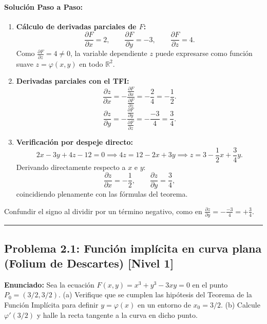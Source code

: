 \documentclass[11pt,a4paper]{article}
\begin{document}
\paragraph{Solución Paso a Paso:}\par
\begin{enumerate}[label=\textbf{\arabic*.}]
\item \textbf{Cálculo de derivadas parciales de $F$:}
\[ \frac{\partial F}{\partial x} = 2, \qquad \frac{\partial F}{\partial y} = -3, \qquad \frac{\partial F}{\partial z} = 4. \]
Como $\frac{\partial F}{\partial z} = 4 \neq 0$, la variable dependiente $z$ puede expresarse como función suave $z = \varphi(x,y)$ en todo $\mathbb{R}^2$.
\item \textbf{Derivadas parciales con el TFI:}
\[ \frac{\partial z}{\partial x} = -\frac{\frac{\partial F}{\partial x}}{\frac{\partial F}{\partial z}} = -\frac{2}{4} = -\frac{1}{2}. \]
\[ \frac{\partial z}{\partial y} = -\frac{\frac{\partial F}{\partial y}}{\frac{\partial F}{\partial z}} = -\frac{-3}{4} = \frac{3}{4}. \]
\item \textbf{Verificación por despeje directo:}
\[ 2x - 3y + 4z - 12 = 0 \implies 4z = 12 - 2x + 3y \implies z = 3 - \frac{1}{2}x + \frac{3}{4}y. \]
Derivando directamente respecto a $x$ e $y$:
\[ \frac{\partial z}{\partial x} = -\frac{1}{2}, \qquad \frac{\partial z}{\partial y} = \frac{3}{4}, \]
coincidiendo plenamente con las fórmulas del teorema.
\end{enumerate}

\begin{trapbox}
Confundir el signo al dividir por un término negativo, como en $\frac{\partial z}{\partial y} = -\frac{-3}{4} = +\frac{3}{4}$.
\end{trapbox}

\vspace{0.5cm}
\hrule
\vspace{0.5cm}


\subsection*{Problema 2.1: Función implícita en curva plana (Folium de Descartes) \hfill \color{primaryblue}\small[Nivel 1]}

\begin{tcolorbox}[colback=white,colframe=gray!40,arc=1mm,boxrule=0.5pt,left=3mm,right=3mm,top=2mm,bottom=2mm]
\textbf{Enunciado:} Sea la ecuación $F(x,y) = x^3 + y^3 - 3xy = 0$ en el punto $P_0 = (3/2, 3/2)$. (a) Verifique que se cumplen las hipótesis del Teorema de la Función Implícita para definir $y = \varphi(x)$ en un entorno de $x_0 = 3/2$. (b) Calcule $\varphi'(3/2)$ y halle la recta tangente a la curva en dicho punto.
\end{tcolorbox}
\end{document}
